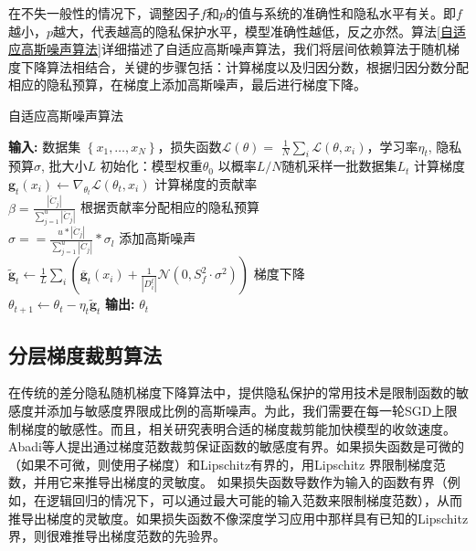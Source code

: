 在不失一般性的情况下，调整因子$f$和$p$的值与系统的准确性和隐私水平有关。即$f$越小，$p$越大，代表越高的隐私保护水平，模型准确性越低，反之亦然。算法\ref{自适应高斯噪声算法}详细描述了自适应高斯噪声算法，我们将层间依赖算法于随机梯度下降算法相结合，关键的步骤包括：计算梯度以及归因分数，根据归因分数分配相应的隐私预算，在梯度上添加高斯噪声，最后进行梯度下降。\\

\begin{algorithm}[!htb]
	\caption{自适应高斯噪声算法}
	\label{自适应高斯噪声算法}
	\begin{algorithmic}[1]
		\footnotesize
		\STATE \textbf{输入:} 数据集 $\left\{x_{1}, \ldots, x_{N}\right\}$，损失函数$\mathcal{L}(\theta)=$ $\frac{1}{N} \sum_{i} \mathcal{L}\left(\theta, x_{i}\right)$，学习率$\eta_{t}$, 隐私预算$\sigma$, 批大小$L$
		\STATE 初始化：模型权重$\theta_{0}$
			\STATE 以概率$L / N$随机采样一批数据集$L_{t}$
			\STATE 计算梯度\\$\mathbf{g}_{t}\left(x_{i}\right) \leftarrow \nabla_{\theta_{t}} \mathcal{L}\left(\theta_{t}, x_{i}\right)$
			\STATE 计算梯度的贡献率\\$\beta=\frac{\left|\ddot{C}_{j}\right|}{\sum_{j=1}^{u}\left|\ddot{C}_{j}\right|}$
			\STATE 根据贡献率分配相应的隐私预算\\$\sigma==\frac{u *\left|\ddot{C}_{j}\right|}{\sum_{j=1}^{u}\left|\ddot{C}_{j}\right|} * \sigma_{l}$
			\STATE 添加高斯噪声\\$\tilde{\mathbf{g}}_{t} \leftarrow \frac{1}{L} \sum_{i}\left(\overline{\mathbf{g}}_{t}\left(x_{i}\right)+\frac{1}{\left|D_{i}^{t}\right|}\mathcal{N}\left(0, S_{f}^{2} \cdot \sigma^{2}\right)\right)$
			\STATE 梯度下降\\$\theta_{t+1} \leftarrow \theta_{t}-\eta_{t} \tilde{\mathbf{g}}_{t}$
		\ENDFOR
		\STATE \textbf{输出:} $\theta_{t}$
	\end{algorithmic}
\end{algorithm}

\subsection{分层梯度裁剪算法}
在传统的差分隐私随机梯度下降算法中，提供隐私保护的常用技术是限制函数的敏感度并添加与敏感度界限成比例的高斯噪声。为此，我们需要在每一轮SGD上限制梯度的敏感性。而且，相关研究表明合适的梯度裁剪能加快模型的收敛速度。Abadi等人提出通过梯度范数裁剪保证函数的敏感度有界。如果损失函数是可微的（如果不可微，则使用子梯度）和Lipschitz有界的，用Lipschitz 界限制梯度范数，并用它来推导出梯度的灵敏度。 如果损失函数导数作为输入的函数有界（例如，在逻辑回归的情况下，可以通过最大可能的输入范数来限制梯度范数），从而推导出梯度的灵敏度。如果损失函数不像深度学习应用中那样具有已知的Lipschitz界，则很难推导出梯度范数的先验界。

